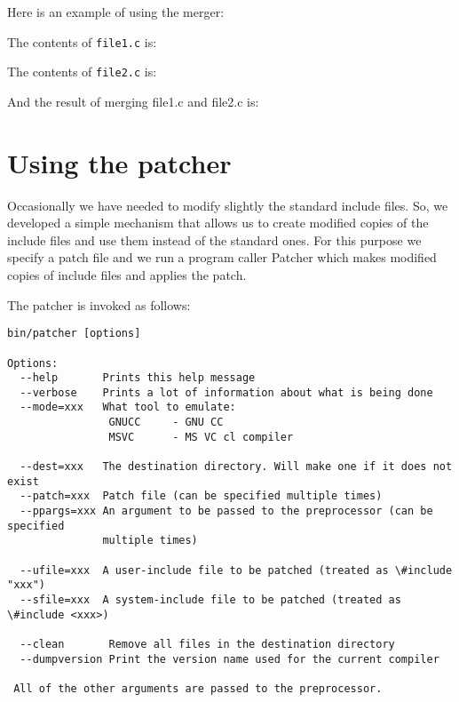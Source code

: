 \documentclass{article}
\def\t#1{{\tt #1}}
\begin{document}
 Here is an example of using the merger:

 The contents of \t{file1.c} is:

 The contents of \t{file2.c} is:


 And the result of merging file1.c and file2.c is:


    \section{Using the patcher}\label{sec-patcher}

 Occasionally we have needed to modify slightly the standard include files.
So, we developed a simple mechanism that allows us to create modified copies
of the include files and use them instead of the standard ones. For this
purpose we specify a patch file and we run a program caller Patcher which
makes modified copies of include files and applies the patch.

 The patcher is invoked as follows: 
\begin{verbatim}
bin/patcher [options]

Options:
  --help       Prints this help message
  --verbose    Prints a lot of information about what is being done
  --mode=xxx   What tool to emulate: 
                GNUCC     - GNU CC
                MSVC      - MS VC cl compiler

  --dest=xxx   The destination directory. Will make one if it does not exist
  --patch=xxx  Patch file (can be specified multiple times)
  --ppargs=xxx An argument to be passed to the preprocessor (can be specified
               multiple times)

  --ufile=xxx  A user-include file to be patched (treated as \#include "xxx")
  --sfile=xxx  A system-include file to be patched (treated as \#include <xxx>)
 
  --clean       Remove all files in the destination directory
  --dumpversion Print the version name used for the current compiler

 All of the other arguments are passed to the preprocessor.
\end{verbatim}
\end{document}

